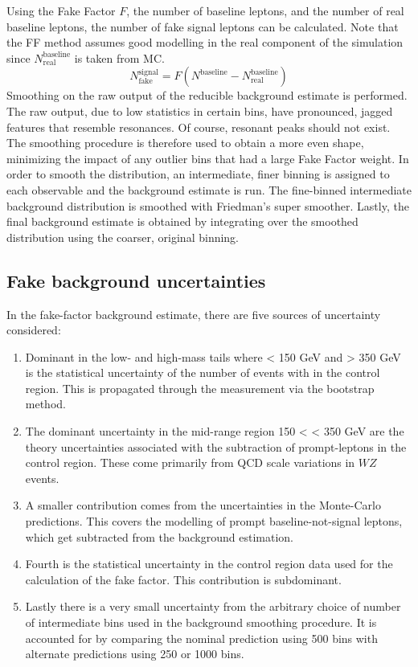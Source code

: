 Using the Fake Factor $F$, the number of baseline leptons, and the number of real baseline leptons, the number of fake signal leptons can be calculated. Note that the FF method assumes good modelling in the real component of the simulation since $N^{\text{baseline}}_{\text{real}}$ is taken from MC.
$$N_{\text{fake}}^{\text{signal}} = F(N^{\text{baseline}}-N^{\text{baseline}}_{\text{real}})$$
Smoothing on the raw output of the reducible background estimate is performed. The raw output, due to low statistics in certain bins, have pronounced, jagged features that resemble resonances. Of course, resonant peaks should not exist. The smoothing procedure is therefore used to obtain a more even shape, minimizing the impact of any outlier bins that had a large Fake Factor weight. In order to smooth the distribution, an intermediate, finer binning is assigned to each observable and the background estimate is run. The fine-binned intermediate background distribution is smoothed with Friedman's super smoother. Lastly, the final background estimate is obtained by integrating over the smoothed distribution using the coarser, original binning. 

\subsection{Fake background uncertainties}
\label{ssec:fakeuncertainty}

In the fake-factor background estimate, there are five sources of uncertainty considered:
\begin{enumerate}
    \item Dominant in the low- and high-mass tails where \mFourL < 150 GeV and \mFourL > 350 GeV is the statistical uncertainty of the number of events with in the control region. This is propagated through the measurement via the bootstrap method.
    \item The dominant uncertainty in the mid-range region 150 < \mFourL < 350 GeV are the theory uncertainties associated with the subtraction of prompt-leptons in the control region. These come primarily from QCD scale variations in $WZ$ events. 
    \item A smaller contribution comes from the uncertainties in the Monte-Carlo predictions. This covers the modelling of prompt baseline-not-signal leptons, which get subtracted from the background estimation.  
    \item Fourth is the statistical uncertainty in the control region data used for the calculation of the fake factor. This contribution is subdominant. 
    \item Lastly there is a very small uncertainty from the arbitrary choice of number of intermediate bins used in the background smoothing procedure. It is accounted for by comparing the nominal prediction using 500 bins with alternate predictions using 250 or 1000 bins. 
\end{enumerate}
